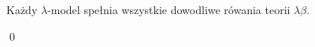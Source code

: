 \begin{twierdzenie}
  Każdy \(\lambda\)-model spełnia wszystkie dowodliwe rówania teorii \(\lambda\beta\).
\end{twierdzenie}
\begin{dowod}
  \qed
\end{dowod}
  




